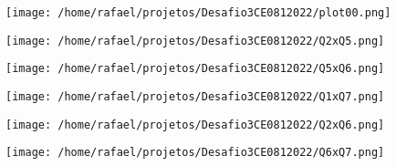 \documentclass[
		a4paper,
		11pt,
		extrafontsizes,
		oneside,
		onecolumn,
		openright,
		final,
		article,
		brazil,
		sumario=tradicional
]{abntex2}
\begin{document}
\begin{figure}[htp]
\centering
\texttt{[image: /home/rafael/projetos/Desafio3CE0812022/plot00.png]}
\caption{}
\label{tabela}
\end{figure}

\begin{figure}[htp]
\centering
\texttt{[image: /home/rafael/projetos/Desafio3CE0812022/Q2xQ5.png]}
\caption{}
\label{Q2xQ5}
\end{figure}

\begin{figure}[htp]
\centering
\texttt{[image: /home/rafael/projetos/Desafio3CE0812022/Q5xQ6.png]}
\caption{}
\label{Q5xQ6}
\end{figure}

\begin{figure}[htp]
\centering
\texttt{[image: /home/rafael/projetos/Desafio3CE0812022/Q1xQ7.png]}
\caption{}
\label{Q1xQ7}
\end{figure}

\begin{figure}[htp]
\centering
\texttt{[image: /home/rafael/projetos/Desafio3CE0812022/Q2xQ6.png]}
\caption{}
\label{Q2xQ6}
\end{figure}

\begin{figure}[htp]
\centering
\texttt{[image: /home/rafael/projetos/Desafio3CE0812022/Q6xQ7.png]}
\caption{}
\label{Q6xQ7}
\end{figure}
\end{document}
